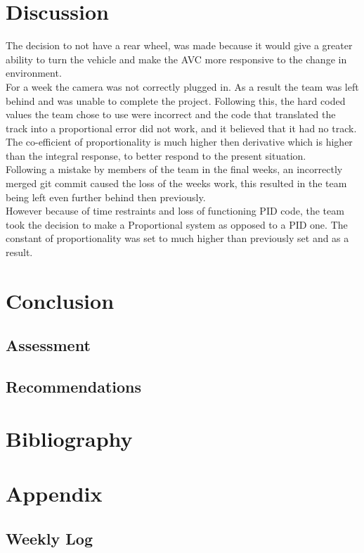 \documentclass[paper=a4, fontsize=11pt]{scrartcl} %
\numberwithin{equation}{section} %
\numberwithin{figure}{section} %
\begin{document}
\section{Discussion}
The decision to not have a rear wheel, was made because it would give a greater
ability to turn the vehicle and make the AVC more responsive to the change in
environment.\\
For a week the camera was not correctly plugged in. As a result the team was
left behind and was unable to complete the project. Following this, the hard
coded values the team chose to use were incorrect and the code that translated
the track into a proportional error did not work, and it believed that it had no
track.\\
The co-efficient of proportionality is much higher then derivative which is
higher than the integral response, to better respond to the present situation.\\
Following a mistake by members of the team in the final weeks, an incorrectly
merged git commit caused the loss of the weeks work, this resulted in the team
being left even further behind then previously.\\
However because of time restraints and loss of functioning PID code, the team
took the decision to make a Proportional system as opposed to a PID one. The
constant of proportionality was set to much higher than previously set and as a
result.\\
\section{Conclusion}
\subsection{Assessment}
\subsection{Recommendations}
\section{Bibliography}
\printbibliography{}
\section{Appendix}
\subsection{Weekly Log}
\end{document}
